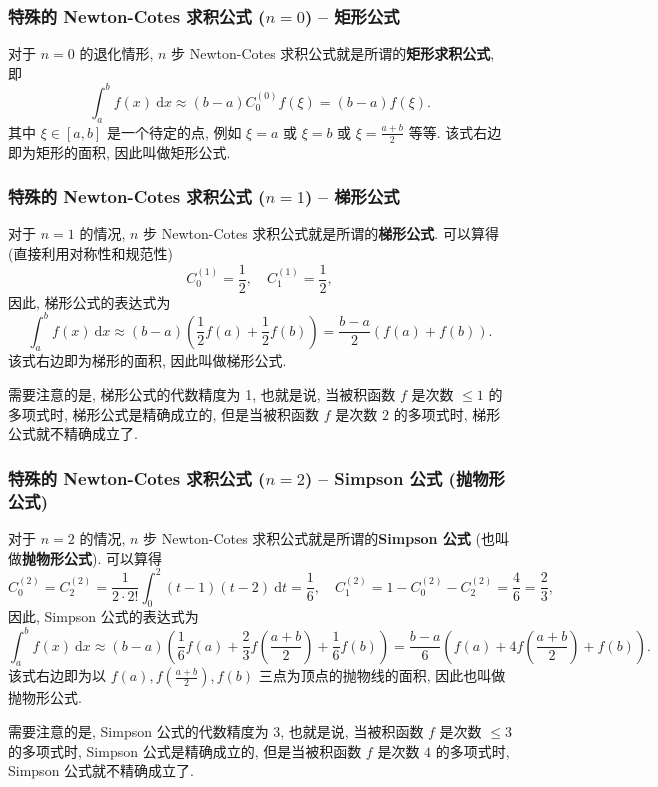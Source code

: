 
\begin{frame}
\frametitle{特殊的 Newton-Cotes 求积公式 ($n = 0$) -- 矩形公式}

对于 $n = 0$ 的退化情形, $n$ 步 Newton-Cotes 求积公式就是所谓的\textbf{矩形求积公式}, 即
\[
\int_a^b f(x) ~ \mathrm{d}x \approx (b-a) C_0^{(0)} f(\xi) = (b-a) f(\xi).
\]
其中 $\xi \in [a, b]$ 是一个待定的点, 例如 $\xi = a$ 或 $\xi = b$ 或 $\xi = \frac{a+b}{2}$ 等等. 该式右边即为矩形的面积, 因此叫做矩形公式.

\end{frame}


\begin{frame}
\frametitle{特殊的 Newton-Cotes 求积公式 ($n = 1$) -- 梯形公式}

对于 $n = 1$ 的情况, $n$ 步 Newton-Cotes 求积公式就是所谓的\textbf{梯形公式}. 可以算得 (直接利用对称性和规范性)
\[
C_0^{(1)} = \frac{1}{2}, \quad C_1^{(1)} = \frac{1}{2},
\]
因此, 梯形公式的表达式为
\[
\int_a^b f(x) ~ \mathrm{d}x \approx (b-a) \left( \frac{1}{2} f(a) + \frac{1}{2} f(b) \right) = \frac{b-a}{2} (f(a) + f(b)).
\]
该式右边即为梯形的面积, 因此叫做梯形公式.

\pause
\vspace{0.5em}

需要注意的是, 梯形公式的代数精度为 1, 也就是说, 当被积函数 $f$ 是次数 $\leqslant 1$ 的多项式时, 梯形公式是精确成立的, 但是当被积函数 $f$ 是次数 $2$ 的多项式时, 梯形公式就不精确成立了.

\end{frame}


\begin{frame}
\frametitle{特殊的 Newton-Cotes 求积公式 ($n = 2$) -- Simpson 公式 (抛物形公式)}

对于 $n = 2$ 的情况, $n$ 步 Newton-Cotes 求积公式就是所谓的\textbf{Simpson 公式} (也叫做\textbf{抛物形公式}). 可以算得
\[
C_0^{(2)} = C_2^{(2)} = \frac{1}{2\cdot 2!} \int_0^2 (t-1)(t-2) ~ \mathrm{d}t = \frac{1}{6}, \quad C_1^{(2)} = 1 - C_0^{(2)} - C_2^{(2)} = \frac{4}{6} = \frac{2}{3},
\]
因此, Simpson 公式的表达式为
\[
\int_a^b f(x) ~ \mathrm{d}x \approx (b-a) \left( \frac{1}{6} f(a) + \frac{2}{3} f(\frac{a+b}{2}) + \frac{1}{6} f(b) \right) = \frac{b-a}{6} \left( f(a) + 4 f(\frac{a+b}{2}) + f(b) \right).
\]
该式右边即为以 $f(a), f(\frac{a+b}{2}), f(b)$ 三点为顶点的抛物线的面积, 因此也叫做抛物形公式.

\pause
\vspace{0.5em}

需要注意的是, Simpson 公式的代数精度为 3, 也就是说, 当被积函数 $f$ 是次数 $\leqslant 3$ 的多项式时, Simpson 公式是精确成立的, 但是当被积函数 $f$ 是次数 $4$ 的多项式时, Simpson 公式就不精确成立了.

\end{frame}

